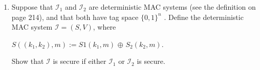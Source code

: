 \documentclass[11pt]{article}
\begin{document}
\begin{enumerate}
\begin{enumerate}
      	\item Suppose that $\mathcal{I}_1$ and $\mathcal{I}_2$ are deterministic MAC systems (see the definition on page 214), and
      	that both have tag space $\{0, 1\}^n$ . Define the deterministic MAC system $\mathcal{I} = (S, V )$, where
      	\begin{center}
      		$S( (k_1 , k_2 ), m) := S 1 (k_1 , m) $ $\oplus$ $ S_2 (k_2 , m)$.
      	\end{center}
      
      	Show that $\mathcal{I}$ is secure if either $\mathcal{I}_1$ or $\mathcal{I}_2$ is secure.
      	
      \end{enumerate}
	\end{enumerate}
	
\end{document}
